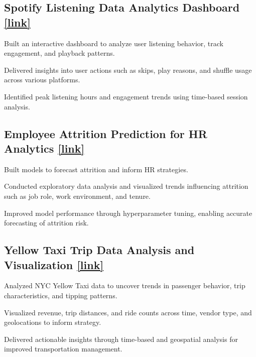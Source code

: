 \subsection{{Spotify Listening Data Analytics Dashboard} \href{https://app.powerbi.com/view?r=eyJrIjoiOGQ3OGJkZWMtY2M0Mi00M2M2LTlhNGItOTliZTdmYjk3NDYxIiwidCI6IjY4ODk2ZGVkLWViZWQtNGE4My05YTQ3LTM2ZTA2M2VjMTVhYyJ9}{[link]}}
\begin{zitemize}
    \setlength\itemsep{0.4em}
    \item Built an interactive dashboard to analyze user listening behavior, track engagement, and playback patterns.
    \item Delivered insights into user actions such as skips, play reasons, and shuffle usage across various platforms.
    \item Identified peak listening hours and engagement trends using time-based session analysis.
\end{zitemize}

\subsection{{Employee Attrition Prediction for HR Analytics} \href{https://colab.research.google.com/github/HarshRaj00789/Predicting-Employee-Attrition-A-Data-Driven-Approach-for-HR-Optimization/blob/main/Predicting_Employee_Attrition_A_Data_Driven_Approach_for_HR_Optimization.ipynb?authuser=1}{[link]}}
\begin{zitemize}
    \setlength\itemsep{0.4em}
    \item Built models to forecast attrition and inform HR strategies.
    \item Conducted exploratory data analysis and visualized trends influencing attrition such as job role, work environment, and tenure.
    \item Improved model performance through hyperparameter tuning, enabling accurate forecasting of attrition risk.
\end{zitemize}

\subsection{{Yellow Taxi Trip Data Analysis and Visualization} \href{https://github.com/HarshRaj00789/Taxi-tip-Exploratory-data-analysis}{[link]}}
\begin{zitemize}
    \setlength\itemsep{0.4em}
    \item Analyzed NYC Yellow Taxi data to uncover trends in passenger behavior, trip characteristics, and tipping patterns.
    \item Visualized revenue, trip distances, and ride counts across time, vendor type, and geolocations to inform strategy.
    \item Delivered actionable insights through time-based and geospatial analysis for improved transportation management.
\end{zitemize}
